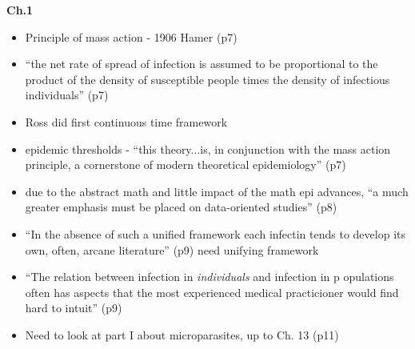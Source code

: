 \documentclass{article}
\begin{document}
\textbf{Ch.1}
\begin{itemize}
\item Principle of mass action - 1906 Hamer (p7)
\item ``the net rate of spread of infection is assumed to be proportional to the product of the density of susceptible people times the density of infectious individuals''  (p7)
\item Ross did first continuous time framework
\item epidemic thresholds - ``this theory...is, in conjunction with the mass action principle, a cornerstone of modern theoretical epidemiology'' (p7)
\item due to the abstract math and little impact of the math epi advances, ``a much greater emphasis must be placed on data-oriented studies'' (p8)
\item ``In the absence of such a unified framework each infectin tends to develop its own, often, arcane literature'' (p9) need unifying framework
\item ``The relation between infection in \textit{individuals} and infection in p opulations often has aspects that the most experienced medical practicioner would find hard to intuit'' (p9)
\item Need to look at part I about microparasites, up to Ch. 13 (p11)
\end{itemize}
\end{document}
